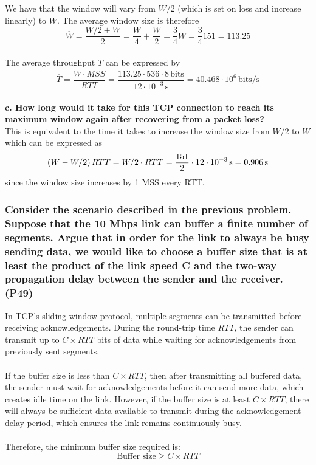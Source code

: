 We have that the window will vary from $W/2$ (which is set on loss and increase linearly) to $W$. The average window size is therefore 
\begin{equation*}
    \overline{W} = \frac{W/2 + W}{2} = \frac{W}{4} + \frac{W}{2} = \frac{3}{4} W = \frac{3}{4} 151 = 113.25
\end{equation*}
\\
The average throughput $\overline{T}$ can be expressed by
\begin{equation*}
    \overline{T} = \frac{\overline{W} \cdot MSS}{RTT} = \frac{113.25 \cdot 536 \cdot 8 \, \text{bits}}{12 \cdot 10^{-3} \, \text{s}} = 40.468 \cdot 10^6 \, \text{bits/s}
\end{equation*}
\\
\textbf{c. How long would it take for this TCP connection to reach its maximum window again after recovering from a packet loss?} \\
This is equivalent to the time it takes to increase the window size from $W/2$ to $W$ which can be expressed as
\begin{equation*}
    \left (W - W/2\right) RTT = W/2 \cdot RTT  = \frac{151}{2} \cdot 12 \cdot 10^{-3} \, \text{s} = 0.906 \, \text{s}
\end{equation*}
since the window size increases by 1 MSS every RTT.

\subsubsection{Consider the scenario described in the previous problem. Suppose that the 10 Mbps link can buffer a finite number of segments. Argue that in order for the link to always be busy sending data, we would like to choose a buffer size that is at least the product of the link speed C and the two-way propagation delay between the sender and the receiver. (P49)}

In TCP's sliding window protocol, multiple segments can be transmitted before receiving acknowledgements. During the round-trip time $RTT$, the sender can transmit up to $C \times RTT$ bits of data while waiting for acknowledgements from previously sent segments. \\
\\
If the buffer size is less than $C \times RTT$, then after transmitting all buffered data, the sender must wait for acknowledgements before it can send more data, which creates idle time on the link. However, if the buffer size is at least $C \times RTT$, there will always be sufficient data available to transmit during the acknowledgement delay period, which ensures the link remains continuously busy.\\
\\
Therefore, the minimum buffer size required is:
$$\text{Buffer size} \geq C \times RTT$$

